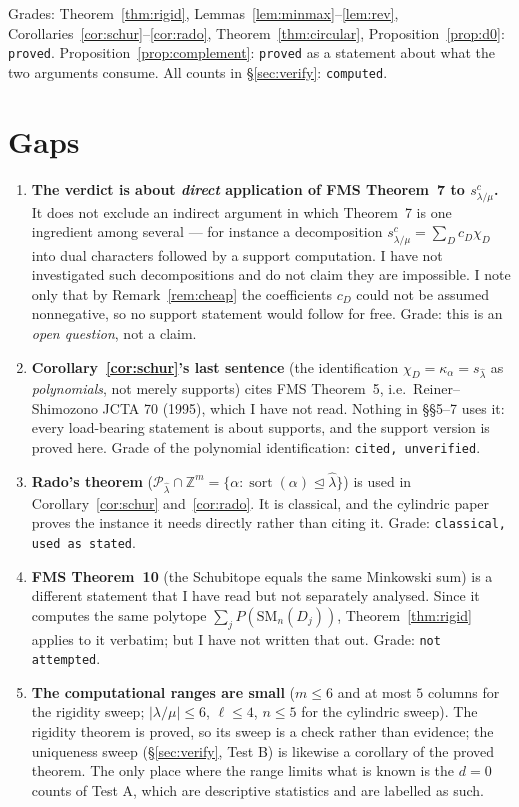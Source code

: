 \documentclass[11pt]{article}
\theoremstyle{definition}
\DeclareMathOperator{\sort}{sort}
\newcommand{\Z}{\mathbb{Z}}
\newcommand{\SM}{\mathrm{SM}}
\begin{document}
Grades: Theorem~\ref{thm:rigid}, Lemmas~\ref{lem:minmax}--\ref{lem:rev},
Corollaries~\ref{cor:schur}--\ref{cor:rado}, Theorem~\ref{thm:circular},
Proposition~\ref{prop:d0}: \texttt{proved}. Proposition~\ref{prop:complement}: \texttt{proved}
as a statement about what the two arguments consume. All counts in \S\ref{sec:verify}:
\texttt{computed}.

\section{Gaps}

\begin{enumerate}
\item \textbf{The verdict is about \emph{direct} application of FMS Theorem~7 to
$s^c_{\lambda/\mu}$.} It does not exclude an indirect argument in which Theorem~7 is one
ingredient among several --- for instance a decomposition $s^c_{\lambda/\mu}=\sum_D c_D\chi_D$
into dual characters followed by a support computation. I have not investigated such
decompositions and do not claim they are impossible. I note only that by
Remark~\ref{rem:cheap} the coefficients $c_D$ could not be assumed nonnegative, so no support
statement would follow for free. Grade: this is an \emph{open question}, not a claim.

\item \textbf{Corollary~\ref{cor:schur}'s last sentence} (the identification
$\chi_D=\kappa_\alpha=s_{\hat\lambda}$ as \emph{polynomials}, not merely supports) cites FMS
Theorem~5, i.e.\ Reiner--Shimozono JCTA 70 (1995), which I have not read. Nothing in
\S\S5--7 uses it: every load-bearing statement is about supports, and the support version is
proved here. Grade of the polynomial identification: \texttt{cited, unverified}.

\item \textbf{Rado's theorem} ($\mathcal{P}_{\hat\lambda}\cap\Z^m=\{\alpha:\sort(\alpha)
\trianglelefteq\hat\lambda\}$) is used in Corollary~\ref{cor:schur} and~\ref{cor:rado}. It is
classical, and the cylindric paper proves the instance it needs directly rather than citing it.
Grade: \texttt{classical, used as stated}.

\item \textbf{FMS Theorem~10} (the Schubitope equals the same Minkowski sum) is a different
statement that I have read but not separately analysed. Since it computes the same polytope
$\sum_jP(\SM_n(D_j))$, Theorem~\ref{thm:rigid} applies to it verbatim; but I have not written
that out. Grade: \texttt{not attempted}.

\item \textbf{The computational ranges are small} ($m\le6$ and at most $5$ columns for the
rigidity sweep; $|\lambda/\mu|\le6$, $\ell\le4$, $n\le5$ for the cylindric sweep). The rigidity
theorem is proved, so its sweep is a check rather than evidence; the uniqueness sweep
(\S\ref{sec:verify}, Test B) is likewise a corollary of the proved theorem. The only place
where the range limits what is known is the $d=0$ counts of Test A, which are descriptive
statistics and are labelled as such.
\end{enumerate}
\end{document}
